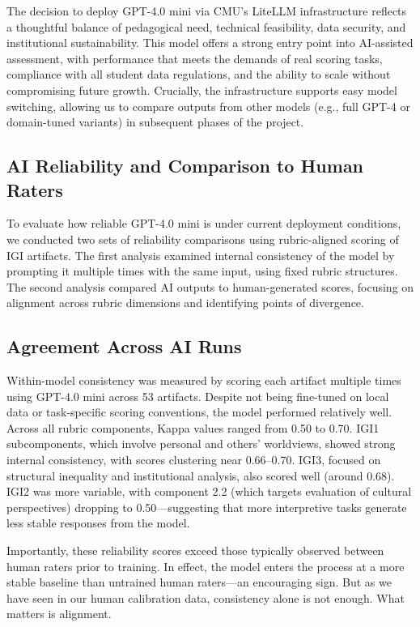 \documentclass[12pt]{article}%
\begin{document}
The decision to deploy GPT-4.0 mini via CMU’s LiteLLM infrastructure reflects a thoughtful balance of pedagogical need, technical feasibility, data security, and institutional sustainability. This model offers a strong entry point into AI-assisted assessment, with performance that meets the demands of real scoring tasks, compliance with all student data regulations, and the ability to scale without compromising future growth. Crucially, the infrastructure supports easy model switching, allowing us to compare outputs from other models (e.g., full GPT-4 or domain-tuned variants) in subsequent phases of the project.

\subsection*{AI Reliability and Comparison to Human Raters}

To evaluate how reliable GPT-4.0 mini is under current deployment conditions, we conducted two sets of reliability comparisons using rubric-aligned scoring of IGI artifacts. The first analysis examined internal consistency of the model by prompting it multiple times with the same input, using fixed rubric structures. The second analysis compared AI outputs to human-generated scores, focusing on alignment across rubric dimensions and identifying points of divergence.

\subsection*{Agreement Across AI Runs}

Within-model consistency was measured by scoring each artifact multiple times using GPT-4.0 mini across 53 artifacts. Despite not being fine-tuned on local data or task-specific scoring conventions, the model performed relatively well. Across all rubric components, Kappa values ranged from 0.50 to 0.70. IGI1 subcomponents, which involve personal and others’ worldviews, showed strong internal consistency, with scores clustering near 0.66–0.70. IGI3, focused on structural inequality and institutional analysis, also scored well (around 0.68). IGI2 was more variable, with component 2.2 (which targets evaluation of cultural perspectives) dropping to 0.50—suggesting that more interpretive tasks generate less stable responses from the model.

Importantly, these reliability scores exceed those typically observed between human raters prior to training. In effect, the model enters the process at a more stable baseline than untrained human raters—an encouraging sign. But as we have seen in our human calibration data, consistency alone is not enough. What matters is alignment.
\end{document}
